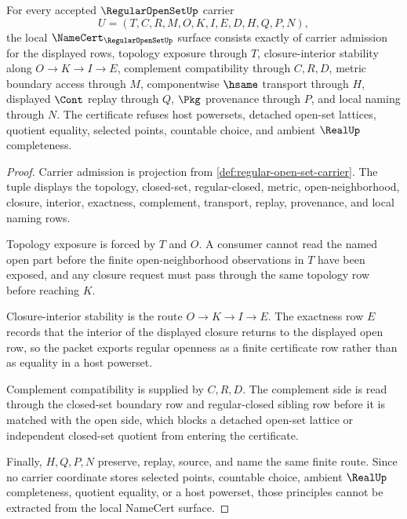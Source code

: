 \begin{theorem}\label{thm:regular-open-set-namecert-obligations}
For every accepted $\RegularOpenSetUp$ carrier
$$
U=(T,C,R,M,O,K,I,E,D,H,Q,P,N),
$$
the local $\NameCert_{\RegularOpenSetUp}$ surface consists exactly of carrier admission for the displayed rows, topology exposure through $T$, closure-interior stability along $O \to K \to I \to E$, complement compatibility through $C,R,D$, metric boundary access through $M$, componentwise $\hsame$ transport through $H$, displayed $\Cont$ replay through $Q$, $\Pkg$ provenance through $P$, and local naming through $N$. The certificate refuses host powersets, detached open-set lattices, quotient equality, selected points, countable choice, and ambient $\RealUp$ completeness.
\end{theorem}
\begin{proof}
Carrier admission is projection from \autoref{def:regular-open-set-carrier}. The tuple displays the topology, closed-set, regular-closed, metric, open-neighborhood, closure, interior, exactness, complement, transport, replay, provenance, and local naming rows.

Topology exposure is forced by $T$ and $O$. A consumer cannot read the named open part before the finite open-neighborhood observations in $T$ have been exposed, and any closure request must pass through the same topology row before reaching $K$.

Closure-interior stability is the route $O \to K \to I \to E$. The exactness row $E$ records that the interior of the displayed closure returns to the displayed open row, so the packet exports regular openness as a finite certificate row rather than as equality in a host powerset.

Complement compatibility is supplied by $C,R,D$. The complement side is read through the closed-set boundary row and regular-closed sibling row before it is matched with the open side, which blocks a detached open-set lattice or independent closed-set quotient from entering the certificate.

Finally, $H,Q,P,N$ preserve, replay, source, and name the same finite route. Since no carrier coordinate stores selected points, countable choice, ambient $\RealUp$ completeness, quotient equality, or a host powerset, those principles cannot be extracted from the local NameCert surface.
\end{proof}

